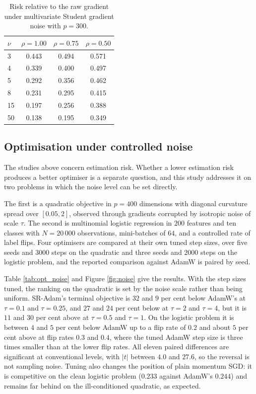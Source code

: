 \documentclass[a4paper,fleqn]{cas-dc}
\theoremstyle{plain}
\theoremstyle{definition}
\theoremstyle{remark}
\newcommand{\rev}[1]{#1}
\begin{document}
\begin{table}
\centering
\caption{Risk relative to the raw gradient under multivariate Student gradient noise with $p=300$.}
\label{tab:heavy}
\begin{tabular}{lccc}
\toprule
$\nu$ & $\rho=1.00$ & $\rho=0.75$ & $\rho=0.50$ \\
\midrule
3  & 0.443 & 0.494 & 0.571 \\
4  & 0.339 & 0.400 & 0.497 \\
5  & 0.292 & 0.356 & 0.462 \\
8  & 0.231 & 0.295 & 0.415 \\
15 & 0.197 & 0.256 & 0.388 \\
50 & 0.138 & 0.195 & 0.349 \\
\bottomrule
\end{tabular}
\end{table}

\subsection{Optimisation under controlled noise}
\label{sec:sim_opt}

The studies above concern estimation risk. Whether a lower estimation risk produces a better optimiser is a separate question, and this study addresses it on two problems in which the noise level can be set directly.

The first is a quadratic objective in $p=400$ dimensions with diagonal curvature spread over $[0.05,2]$, observed through gradients corrupted by isotropic noise of scale $\tau$. The second is multinomial logistic regression in $200$ features and ten classes with $N=20\,000$ observations, mini-batches of $64$, and a controlled rate of label flips. Four optimisers are compared at their own tuned step sizes, over five seeds and $3000$ steps on the quadratic and three seeds and $2000$ steps on the logistic problem, and the reported comparison against AdamW is paired by seed.

Table \ref{tab:opt_noise} and Figure \ref{fig:noise} give the results. With the step sizes tuned, the ranking on the quadratic is set by the noise scale rather than being uniform. SR-Adam's terminal objective is $32$ and $9$ per cent below AdamW's at $\tau=0.1$ and $\tau=0.25$, and $27$ and $24$ per cent below at $\tau=2$ and $\tau=4$, but it is $11$ and $30$ per cent above at $\tau=0.5$ and $\tau=1$. On the logistic problem it is between $4$ and $5$ per cent below AdamW up to a flip rate of $0.2$ and \rev{about} $5$ per cent above at flip rates $0.3$ and $0.4$, where the tuned AdamW step size is three times smaller than at the lower flip rates. All eleven paired differences are significant at conventional levels, with $|t|$ between $4.0$ and $27.6$, so the reversal is not sampling noise. Tuning also changes the position of plain momentum SGD: it is competitive on the clean logistic problem ($0.233$ against AdamW's $0.244$) and remains far behind on the ill-conditioned quadratic, as expected.
\end{document}

